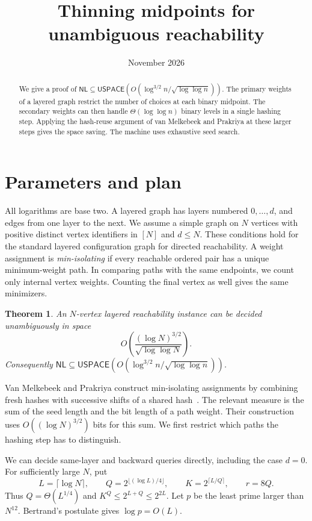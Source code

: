 \documentclass[11pt]{article}
\title{Thinning midpoints for unambiguous reachability}
\author{}
\date{November 2026}
\newtheorem{theorem}{Theorem}
\newcommand{\NL}{\mathsf{NL}}
\newcommand{\US}{\mathsf{USPACE}}
\begin{document}
\maketitle
\begin{abstract}
We give a proof of $\NL\subseteq\US(O(\log^{3/2}n/\sqrt{\log\log n}))$.
The primary weights of a layered graph restrict the number of choices at each binary midpoint. The secondary weights can then handle $\Theta(\log\log n)$ binary levels in a single hashing step. Applying the hash-reuse argument of van Melkebeek and Prakriya at these larger steps gives the space saving. The machine uses exhaustive seed search.
\end{abstract}

\section{Parameters and plan}

All logarithms are base two. A layered graph has layers numbered $0,\ldots,d$, and edges from one layer to the next. We assume a simple graph on $N$ vertices with positive distinct vertex identifiers in $[N]$ and $d\le N$. These conditions hold for the standard layered configuration graph for directed reachability. A weight assignment is \emph{min-isolating} if every reachable ordered pair has a unique minimum-weight path. In comparing paths with the same endpoints, we count only internal vertex weights. Counting the final vertex as well gives the same minimizers.

\begin{theorem}\label{thm:main}
An $N$-vertex layered reachability instance can be decided unambiguously in space
\[
 O\!\left(\frac{(\log N)^{3/2}}{\sqrt{\log\log N}}\right).
\]
Consequently $\NL\subseteq\US(O(\log^{3/2}n/\sqrt{\log\log n}))$.
\end{theorem}

Van Melkebeek and Prakriya construct min-isolating assignments by combining fresh hashes with successive shifts of a shared hash~\cite{vMP}. The relevant measure is the sum of the seed length and the bit length of a path weight. Their construction uses $O((\log N)^{3/2})$ bits for this sum. We first restrict which paths the hashing step has to distinguish.

We can decide same-layer and backward queries directly, including the case $d=0$. For sufficiently large $N$, put
\[
 L=\lceil\log N\rceil,\qquad
 Q=2^{\lfloor(\log L)/4\rfloor},\qquad
 K=2^{\lceil L/Q\rceil},\qquad r=8Q .
\]
Thus $Q=\Theta(L^{1/4})$ and $K^Q\le 2^{L+Q}\le 2^{2L}$. Let $p$ be the least prime larger than $N^{12}$. Bertrand's postulate gives $\log p=O(L)$.
\end{document}
